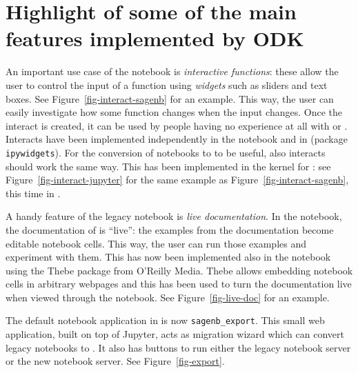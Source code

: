 \documentclass{deliverablereport}
\author{Florent Cayr\'e, Jeroen Demeyer, Nicolas M. Thi\'ery}
\begin{document}
\maketitle
\githubissuedescription
\tableofcontents

\section{Highlight of some of the main features implemented by ODK}

An important use case of the notebook is \emph{interactive functions}:
these allow the user to control the input of a function
using \emph{widgets} such as sliders and text boxes.
See Figure~\ref{fig-interact-sagenb} for an example.
This way, the user can easily investigate how some function changes
when the input changes.
Once the interact is created, it can be used by people having no experience
at all with \Sage or \Python.
Interacts have been implemented independently in the \Sage notebook
and in \Jupyter (package \texttt{ipywidgets}).
For the conversion of \Sage notebooks to \Jupyter to be useful,
also interacts should work the same way.
This has been implemented in the \Jupyter kernel for \Sage:
see Figure~\ref{fig-interact-jupyter} for the same example as
Figure~\ref{fig-interact-sagenb}, this time in \Jupyter.

A handy feature of the legacy \Sage notebook is \emph{live documentation}.
In the \Sage notebook, the documentation of \Sage is ``live'':
the examples from the documentation become editable notebook cells.
This way, the user can run those examples and experiment with them.
This has now been implemented also in the \Jupyter notebook using
the Thebe package from O'Reilly Media.
Thebe allows embedding \Jupyter notebook cells in arbitrary webpages
and this has been used to turn the \Sage documentation live when viewed
through the \Jupyter notebook.
See Figure~\ref{fig-live-doc} for an example.

The default notebook application in \Sage is now
\texttt{sagenb\_export}.  This small web application, built on top of
Jupyter, acts as migration wizard which can convert legacy \Sage
notebooks to \Jupyter. It also has buttons to run either the legacy
\Sage notebook server or the new \Jupyter notebook server. See
Figure~\ref{fig-export}.
\end{document}

